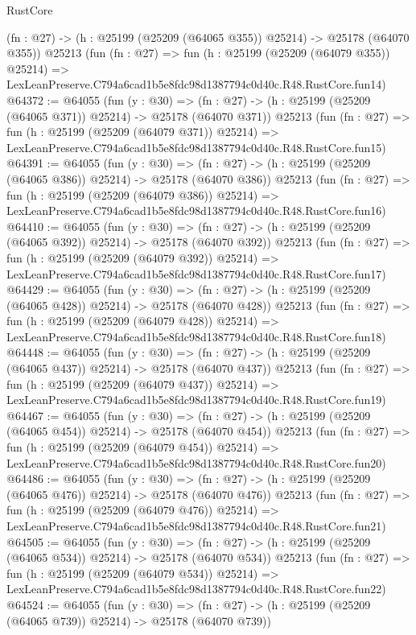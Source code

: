 \begin{lexlean}{RustCore}
\begin{coremodule}
    (fn : @27) -> (h : @25199 (@25209 (@64065 @355)) @25214) -> @25178 (@64070 @355))
    @25213
    (fun (fn : @27) =>
    fun (h : @25199 (@25209 (@64079 @355)) @25214) =>
    LexLeanPreserve.C794a6cad1b5e8fdc98d1387794c0d40c.R48.RustCore.fun14)
@64372 := @64055
    (fun (y : @30) =>
    (fn : @27) -> (h : @25199 (@25209 (@64065 @371)) @25214) -> @25178 (@64070 @371))
    @25213
    (fun (fn : @27) =>
    fun (h : @25199 (@25209 (@64079 @371)) @25214) =>
    LexLeanPreserve.C794a6cad1b5e8fdc98d1387794c0d40c.R48.RustCore.fun15)
@64391 := @64055
    (fun (y : @30) =>
    (fn : @27) -> (h : @25199 (@25209 (@64065 @386)) @25214) -> @25178 (@64070 @386))
    @25213
    (fun (fn : @27) =>
    fun (h : @25199 (@25209 (@64079 @386)) @25214) =>
    LexLeanPreserve.C794a6cad1b5e8fdc98d1387794c0d40c.R48.RustCore.fun16)
@64410 := @64055
    (fun (y : @30) =>
    (fn : @27) -> (h : @25199 (@25209 (@64065 @392)) @25214) -> @25178 (@64070 @392))
    @25213
    (fun (fn : @27) =>
    fun (h : @25199 (@25209 (@64079 @392)) @25214) =>
    LexLeanPreserve.C794a6cad1b5e8fdc98d1387794c0d40c.R48.RustCore.fun17)
@64429 := @64055
    (fun (y : @30) =>
    (fn : @27) -> (h : @25199 (@25209 (@64065 @428)) @25214) -> @25178 (@64070 @428))
    @25213
    (fun (fn : @27) =>
    fun (h : @25199 (@25209 (@64079 @428)) @25214) =>
    LexLeanPreserve.C794a6cad1b5e8fdc98d1387794c0d40c.R48.RustCore.fun18)
@64448 := @64055
    (fun (y : @30) =>
    (fn : @27) -> (h : @25199 (@25209 (@64065 @437)) @25214) -> @25178 (@64070 @437))
    @25213
    (fun (fn : @27) =>
    fun (h : @25199 (@25209 (@64079 @437)) @25214) =>
    LexLeanPreserve.C794a6cad1b5e8fdc98d1387794c0d40c.R48.RustCore.fun19)
@64467 := @64055
    (fun (y : @30) =>
    (fn : @27) -> (h : @25199 (@25209 (@64065 @454)) @25214) -> @25178 (@64070 @454))
    @25213
    (fun (fn : @27) =>
    fun (h : @25199 (@25209 (@64079 @454)) @25214) =>
    LexLeanPreserve.C794a6cad1b5e8fdc98d1387794c0d40c.R48.RustCore.fun20)
@64486 := @64055
    (fun (y : @30) =>
    (fn : @27) -> (h : @25199 (@25209 (@64065 @476)) @25214) -> @25178 (@64070 @476))
    @25213
    (fun (fn : @27) =>
    fun (h : @25199 (@25209 (@64079 @476)) @25214) =>
    LexLeanPreserve.C794a6cad1b5e8fdc98d1387794c0d40c.R48.RustCore.fun21)
@64505 := @64055
    (fun (y : @30) =>
    (fn : @27) -> (h : @25199 (@25209 (@64065 @534)) @25214) -> @25178 (@64070 @534))
    @25213
    (fun (fn : @27) =>
    fun (h : @25199 (@25209 (@64079 @534)) @25214) =>
    LexLeanPreserve.C794a6cad1b5e8fdc98d1387794c0d40c.R48.RustCore.fun22)
@64524 := @64055
    (fun (y : @30) =>
    (fn : @27) -> (h : @25199 (@25209 (@64065 @739)) @25214) -> @25178 (@64070 @739))

\end{coremodule}
\end{lexlean}
